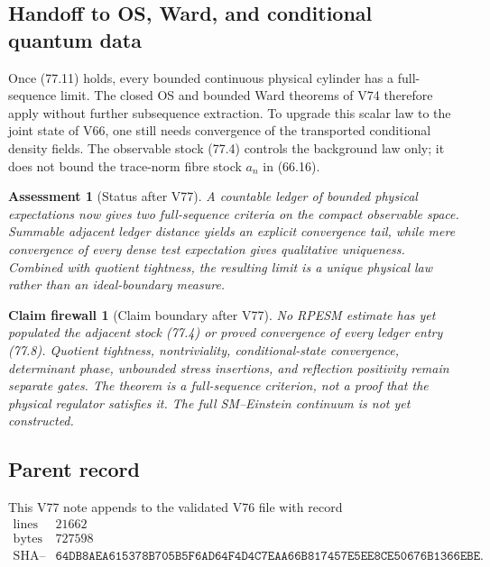 \documentclass[11pt]{article}
\newtheorem{firewall}[theorem]{Claim firewall}
\newtheorem{assessment}[theorem]{Assessment}
\theoremstyle{remark}
\begin{document}
\subsection{Handoff to OS, Ward, and conditional quantum data}

Once (77.11) holds, every bounded continuous physical cylinder has a
full-sequence limit.  The closed OS and bounded Ward theorems of V74
therefore apply without further subsequence extraction.  To upgrade
this scalar law to the joint state of V66, one still needs convergence
of the transported conditional density fields.  The observable stock
(77.4) controls the background law only; it does not bound the
trace-norm fibre stock \(a_n\) in (66.16).

\begin{assessment}[Status after V77]
\label{ass:v12v77-status}
A countable ledger of bounded physical expectations now gives two
full-sequence criteria on the compact observable space.  Summable
adjacent ledger distance yields an explicit convergence tail, while
mere convergence of every dense test expectation gives qualitative
uniqueness.  Combined with quotient tightness, the resulting limit
is a unique physical law rather than an ideal-boundary measure.
\end{assessment}

\begin{firewall}[Claim boundary after V77]
\label{fire:v12v77-claim}
No RPESM estimate has yet populated the adjacent stock (77.4) or
proved convergence of every ledger entry (77.8).  Quotient tightness,
nontriviality, conditional-state convergence, determinant phase,
unbounded stress insertions, and reflection positivity remain
separate gates.  The theorem is a full-sequence criterion, not a
proof that the physical regulator satisfies it.  The full
SM--Einstein continuum is not yet constructed.
\end{firewall}

\subsection{Parent record}

This V77 note appends to the validated V76 file with record
\[
\begin{array}{c|c}
\text{lines}&21662\\
\text{bytes}&727598\\
\text{SHA--256}&
\texttt{64DB8AEA615378B705B5F6AD64F4D4C7EAA66B817457E5EE8CE50676B1366EBE}.
\end{array}
\]
\end{document}
